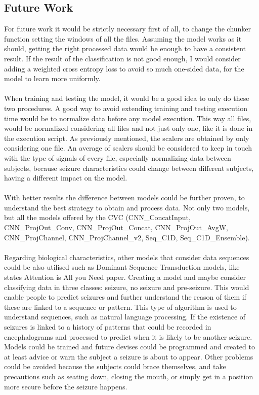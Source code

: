 \subsection{Future Work}
For future work it would be strictly necessary first of all, to change the chunker function setting the windows of all the files. Assuming the model works as it should, getting the right processed data would be enough to have a consistent result. If the result of the classification is not good enough, I would consider adding a weighted cross entropy loss to avoid so much one-sided data, for the model to learn more uniformly.
\\\\
When training and testing the model, it would be a good idea to only do these two procedures. A good way to avoid extending training and testing execution time would be to normalize data before any model execution. This way all files, would be normalized considering all files and not just only one, like it is done in the execution script. As previously mentioned, the scalers are obtained by only considering one file. An average of scalers should be considered to keep in touch with the type of signals of every file, especially normalizing data between subjects, because seizure characteristics could change between different subjects, having a different impact on the model.
\\\\
With better results the difference between models could be further proven, to understand the best strategy to obtain and process data. Not only two models, but all the models offered by the CVC (CNN\_ConcatInput, CNN\_ProjOut\_Conv, CNN\_ProjOut\_Concat, CNN\_ProjOut\_AvgW, CNN\_ProjChannel, CNN\_ProjChannel\_v2, Seq\_C1D, Seq\_C1D\_Ensemble).
\\\\
Regarding biological characteristics, other models that consider data sequences could be also utilised such as Dominant Sequence Transduction models, like states Attention is All you Need paper\cite{vaswani2017attention}. Creating a model and maybe consider classifying data in three classes: seizure, no seizure and pre-seizure. This would enable people to predict seizures and further understand the reason of them if these are linked to a sequence or pattern. This type of algorithm is used to understand sequences, such as natural language processing. If the existence of seizures is linked to a history of patterns that could be recorded in encephalograms and processed to predict when it is likely to be another seizure. Models could be trained and future devises could be programmed and created to at least advice or warn the subject a seizure is about to appear. Other problems could be avoided because the subjects could brace themselves, and take precautions such as seating down, closing the mouth, or simply get in a position more secure before the seizure happens.
